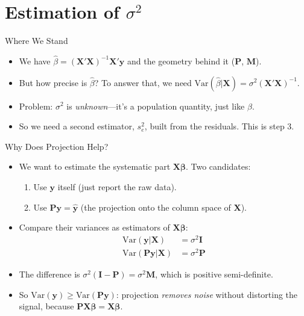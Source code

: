 \documentclass[aspectratio=169, handout]{beamer}
\numberwithin{equation}{section}
\begin{document}
\section{Estimation of \texorpdfstring{$\sigma^2$}{the error variance}}

\begin{frame}{Where We Stand}
\begin{itemize}
\item We have $\hat{\beta}=(\bm{X'X})^{-1}\bm{X'y}$ and the geometry behind it ($\bm{P}$, $\bm{M}$).\pause
\item But how precise is $\hat{\beta}$? To answer that, we need $\text{Var}(\hat{\beta}|\bm{X})=\sigma^2(\bm{X'X})^{-1}$.\pause
\item Problem: $\sigma^2$ is \emph{unknown}---it's a population quantity, just like $\beta$.\pause
\item So we need a second estimator, $s^2_e$, built from the residuals. This is step 3.
\end{itemize}
\end{frame}

\begin{frame}{Why Does Projection Help?}
\begin{itemize}
\item We want to estimate the systematic part $\bm{X\beta}$. Two candidates:
\begin{enumerate}
\item Use $\bm{y}$ itself (just report the raw data).
\item Use $\bm{Py}=\bm{\hat{y}}$ (the projection onto the column space of $\bm{X}$).
\end{enumerate}\pause
\item Compare their variances as estimators of $\bm{X\beta}$:
\begin{align*}
\text{Var}(\bm{y}|\bm{X})&=\sigma^2\bm{I}\\
\text{Var}(\bm{Py}|\bm{X})&=\sigma^2\bm{P}
\end{align*}\pause
\item The difference is $\sigma^2(\bm{I}-\bm{P})=\sigma^2\bm{M}$, which is positive semi-definite.
\item So $\text{Var}(\bm{y})\geq \text{Var}(\bm{Py})$: projection \emph{removes noise} without distorting the signal, because $\bm{PX\beta}=\bm{X\beta}$.
\end{itemize}
\end{frame}
\end{document}
